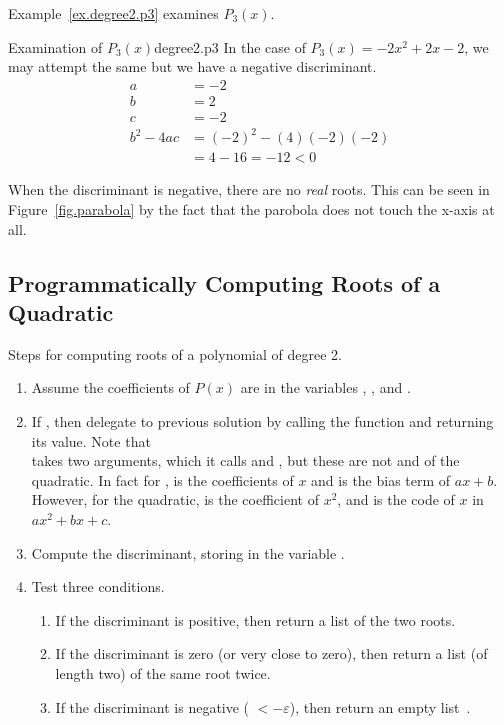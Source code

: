 Example~\ref{ex.degree2.p3} examines $P_3(x)$.

\begin{example}{Examination of $P_3(x)$}{degree2.p3}
  In the case of $P_3(x) = -2x^2 + 2x -2$, we may attempt the same but we have a negative discriminant.
  \begin{align*}
    a&=-2\\
    b&=2\\
    c&=-2\\
    b^2 - 4a c  &=(-2)^2 - (4)(-2)(-2)\\
    &= 4 - 16 = -12 < 0
  \end{align*}

When the discriminant
is negative, there are no \emph{real} roots.  This can be seen in
Figure~\ref{fig.parabola} by the fact that the parobola does not
touch the x-axis at all.
\end{example}

\subsection{Programmatically Computing Roots of a Quadratic}

Steps for computing roots of a polynomial of degree 2.
\begin{enumerate}
\item Assume the coefficients of $P(x)$ are in the variables , , and .
\item If , then delegate to previous solution by calling the function  and returning its value.  Note that \\
   takes two arguments, which it calls  and , but these are not  and  of the quadratic.   In fact for ,  is the coefficients of $x$ and  is the bias term of $a x + b$.  However, for the quadratic,  is the coefficient of $x^2$, and  is the code of $x$ in $a x^2 + b x + c$.
\item Compute the discriminant, storing in the variable .
\item Test three conditions.
  \begin{enumerate}
  \item If the discriminant is positive, then return a list of the two roots.
  \item If the discriminant is zero (or very close to zero), then return a list (of length two) of the same root twice.
  \item If the discriminant is negative ( $< -\varepsilon$), then return an empty list~\code{[]}.
  \end{enumerate}
\end{enumerate}


